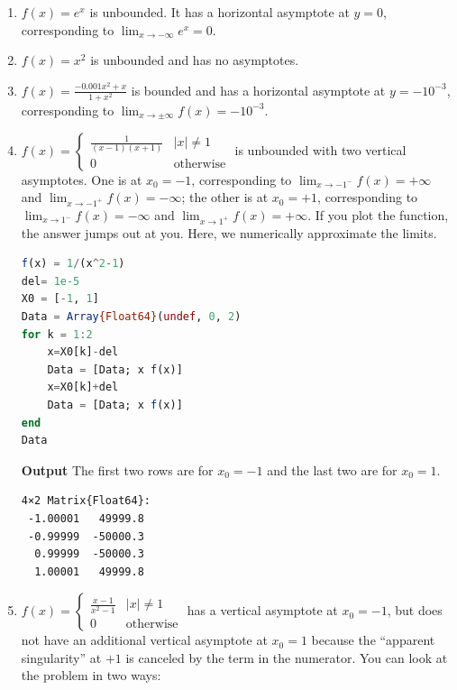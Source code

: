     \begin{enumerate}
\renewcommand{\labelenumi}{(\alph{enumi})}
\setlength{\itemsep}{.2cm}
    \item  \Ans  $f(x) = e^{x}$ is unbounded. It has a horizontal asymptote at $y=0$, corresponding to $\displaystyle \lim_{x \to -\infty} e^{x} = 0$.
    \item  \Ans $f(x) = x^2$ is unbounded and has no asymptotes.
    \item \Ans $f(x) = \frac{-0.001 x^2 + x}{1 + x^2}$ is bounded and has a horizontal asymptote at $y=-10^{-3}$, corresponding to $\displaystyle \lim_{x \to \pm \infty} f(x) = -10^{-3}$.
    
    \item \Ans  $f(x) = \begin{cases} \frac{1}{(x-1)(x+1)} & |x| \neq 1\\ 0 & \text{otherwise} \end{cases}$ is unbounded with two vertical asymptotes. One is at $x_0 = -1$, corresponding to $\displaystyle \lim_{x \to -1^{-}} f(x) = +\infty$ and $\displaystyle \lim_{x \to -1^{+}} f(x) = -\infty$; the other is at $x_0 = +1$, corresponding to $\displaystyle \lim_{x \to 1^{-}} f(x) = -\infty$ and $\displaystyle \lim_{x \to 1^{+}} f(x) = +\infty$. If you plot the function, the answer jumps out at you. Here, we numerically approximate the limits. 

\begin{lstlisting}[language=Julia,style=mystyle]
f(x) = 1/(x^2-1)
del= 1e-5
X0 = [-1, 1]
Data = Array{Float64}(undef, 0, 2)
for k = 1:2
    x=X0[k]-del
    Data = [Data; x f(x)]
    x=X0[k]+del
    Data = [Data; x f(x)]
end
Data
\end{lstlisting}
\textbf{Output} The first two rows are for $x_0 = -1$ and the last two are for $x_0 = 1$.
\begin{verbatim}
4×2 Matrix{Float64}:
 -1.00001   49999.8
 -0.99999  -50000.3
  0.99999  -50000.3
  1.00001   49999.8
\end{verbatim}
    
    \item \Ans $\displaystyle f(x) = \begin{cases} \frac{x-1}{x^2 - 1} & |x| \neq 1\\ 0 & \text{otherwise} \end{cases}$ has a vertical asymptote at $x_0=-1$, but does not have an additional vertical asymptote at $x_0 = 1$ because the ``apparent singularity'' at $+1$ is canceled by the term in the numerator. You can look at the problem in two ways:\\
    

\end{enumerate}
